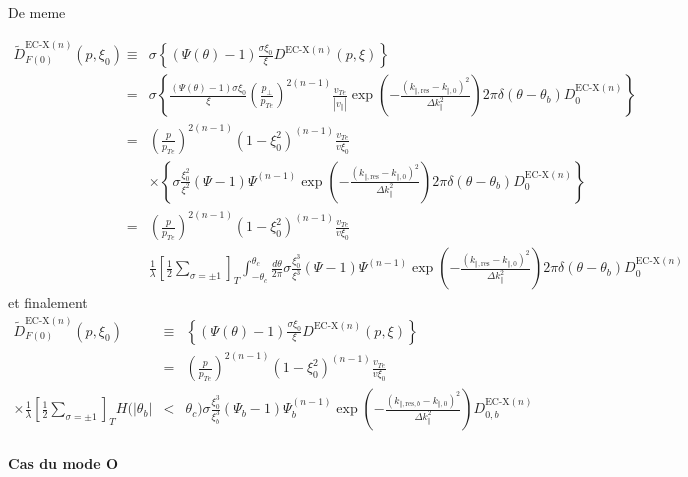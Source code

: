 De meme

\begin{eqnarray*}
\widetilde{D}_{F(0)}^{\text{EC-X}(n)}(p,\xi_{0}) & \equiv & \sigma\left\{ \left(\Psi(\theta)-1\right)\frac{\sigma\xi_{0}}{\xi}D^{\text{EC-X}(n)}(p,\xi)\right\} \\
 & = & \sigma\left\{ \frac{\left(\Psi(\theta)-1\right)\sigma\xi_{0}}{\xi}\left(\frac{p_{\bot}}{p_{Te}}\right)^{2(n-1)}\frac{v_{Te}}{\left|v_{\Vert}\right|}\exp\left(-\frac{\left(k_{\Vert,\text{res}}-k_{\Vert,0}\right)^{2}}{\Delta k_{\Vert}^{2}}\right)2\pi\delta(\theta-\theta_{b})D_{0}^{\text{EC-X}(n)}\right\} \\
 & = & \left(\frac{p}{p_{Te}}\right)^{2(n-1)}\left(1-\xi_{0}^{2}\right)^{(n-1)}\frac{v_{Te}}{v\xi_{0}}\\
 &  & \times\left\{ \sigma\frac{\xi_{0}^{2}}{\xi^{2}}\left(\Psi-1\right)\Psi^{(n-1)}\exp\left(-\frac{\left(k_{\Vert,\text{res}}-k_{\Vert,0}\right)^{2}}{\Delta k_{\Vert}^{2}}\right)2\pi\delta(\theta-\theta_{b})D_{0}^{\text{EC-X}(n)}\right\} \\
 & = & \left(\frac{p}{p_{Te}}\right)^{2(n-1)}\left(1-\xi_{0}^{2}\right)^{(n-1)}\frac{v_{Te}}{v\xi_{0}}\\
 &  & \frac{1}{\lambda}\left[\frac{1}{2}\sum_{\sigma=\pm1}\right]_{T}\int_{-\theta_{c}}^{\theta_{c}}\frac{d\theta}{2\pi}\sigma\frac{\xi_{0}^{3}}{\xi^{3}}\left(\Psi-1\right)\Psi^{(n-1)}\exp\left(-\frac{\left(k_{\Vert,\text{res}}-k_{\Vert,0}\right)^{2}}{\Delta k_{\Vert}^{2}}\right)2\pi\delta(\theta-\theta_{b})D_{0}^{\text{EC-X}(n)}\end{eqnarray*}
 et finalement \begin{eqnarray*}
\widetilde{D}_{F(0)}^{\text{EC-X}(n)}(p,\xi_{0}) & \equiv & \left\{ \left(\Psi(\theta)-1\right)\frac{\sigma\xi_{0}}{\xi}D^{\text{EC-X}(n)}(p,\xi)\right\} \\
 & = & \left(\frac{p}{p_{Te}}\right)^{2(n-1)}\left(1-\xi_{0}^{2}\right)^{(n-1)}\frac{v_{Te}}{v\xi_{0}}\\
\times\frac{1}{\lambda}\left[\frac{1}{2}\sum_{\sigma=\pm1}\right]_{T}H(|\theta_{b}| & < & \theta_{c})\sigma\frac{\xi_{0}^{3}}{\xi_{b}^{3}}\left(\Psi_{b}-1\right)\Psi_{b}^{(n-1)}\exp\left(-\frac{\left(k_{\Vert,\text{res},b}-k_{\Vert,0}\right)^{2}}{\Delta k_{\Vert}^{2}}\right)D_{0,b}^{\text{EC-X}(n)}\end{eqnarray*}



\paragraph{Cas du mode O}

